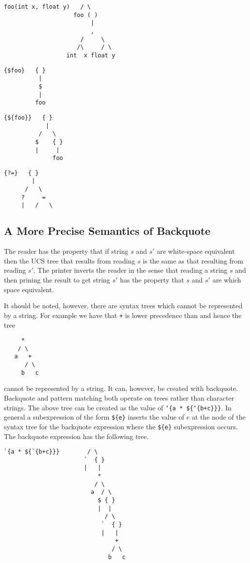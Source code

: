 \documentclass{article}
\begin{document}
\begin{verbatim}
foo(int x, float y)   / \
                    foo ( )
                         |
                         ,
                      /     \
                     /\     / \
                  int  x float y
\end{verbatim}

\begin{verbatim}
{$foo}   { }
          |
          $
          |
         foo
\end{verbatim}

\begin{verbatim}
{${foo}}   { }
            |
          /   \
         $    { }
         |     |
              foo
\end{verbatim}

\begin{verbatim}
{?=}   { }
        |
      /   \
     ?     =
     |   /   \
\end{verbatim}

\subsection{A More Precise Semantics of Backquote}

The reader has the property that if string $s$ and $s'$ are white-space equivalent then the UCS tree that results from reading
$s$ is the same as that resulting from reading $s'$.  The printer inverts the reader
in the sense that reading a string $s$ and then prining the result to get string $s'$ has the property that $s$ and $s'$ are which space equivalent.

It should be noted, however, there are syntax trees which cannot be represented by a string.  For example we have that {\tt +} is lower precedence than {\tt *} and hence the tree
\begin{verbatim}
     *
    / \
   a   +
      / \
     b   c
\end{verbatim}
cannot be represented by a string. It can, however, be created with backquote. Backquote and pattern matching both operate on trees rather than character strings.
The above tree can be created as the value of {\tt `\{a * \$\{`\{b+c\}\}\}}.  In general a subexpression of the form {\tt \$\{e\}} inserts the value of
$e$ at the node of the syntax tree for the backquote expression where the {\tt \$\{e\}} subexpression occurs.  The backquote expression has the following tree.

\begin{verbatim}
`{a * ${`{b+c}}}        / \
                       `  { }
                       |   |
                           *
                          / \
                         a  / \
                           $ { }
                           |  |
                             / \
                            `  { }
                            |   |
                                +
                               / \
                              b   c
\end{verbatim}
\end{document}
